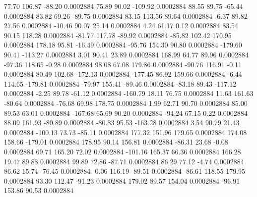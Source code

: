        77.70      106.87      -88.20     0.0002884
       75.89       90.02     -109.92     0.0002884
       88.55       89.75      -65.44     0.0002884
       83.82       69.26      -89.75     0.0002884
       83.15      113.56       89.64     0.0002884
       -6.37       89.82       27.56     0.0002884
      -10.46       90.07       25.14     0.0002884
        4.24       61.17        0.12     0.0002884
       83.54       90.15      118.28     0.0002884
      -81.77      117.78      -89.92     0.0002884
      -85.82      102.42      170.95     0.0002884
      178.18       95.81      -16.49     0.0002884
      -95.76      154.30       90.80     0.0002884
     -179.60       90.41     -113.27     0.0002884
        3.01       90.41       23.89     0.0002884
      168.99       64.77       89.96     0.0002884
      -97.36      118.65       -0.28     0.0002884
       98.08       67.08      179.86     0.0002884
      -90.76      116.91       -0.11     0.0002884
       80.49      102.68     -172.13     0.0002884
     -177.45       86.92      159.66     0.0002884
       -6.44      114.65     -179.81     0.0002884
      -79.97      155.41      -89.46     0.0002884
      -83.18       89.43     -117.12     0.0002884
       -2.25       89.78      -61.12     0.0002884
     -160.79       18.11       76.75     0.0002884
       11.63      161.63      -80.64     0.0002884
      -76.68       69.98      178.75     0.0002884
        1.99       62.71       90.70     0.0002884
       85.00       89.53       63.01     0.0002884
     -167.68       65.69       90.20     0.0002884
      -94.24       67.15        0.22     0.0002884
       88.09      161.93      -80.89     0.0002884
      -80.83       95.53     -163.28     0.0002884
        3.54       90.79       21.43     0.0002884
     -100.13       73.73      -85.11     0.0002884
      177.32      151.96      179.65     0.0002884
      174.08      158.66     -179.01     0.0002884
      178.95       90.14      156.81     0.0002884
      -86.31       23.68       -0.08     0.0002884
       69.71      165.20       72.02     0.0002884
     -101.16      165.37       66.36     0.0002884
      166.28       19.47       89.88     0.0002884
       99.89       72.86      -87.71     0.0002884
       86.29       77.12       -4.74     0.0002884
       86.62       15.74      -76.45     0.0002884
       -0.06      116.19      -89.51     0.0002884
      -86.61      118.55      179.95     0.0002884
       93.30      112.47      -91.23     0.0002884
      179.02       89.57      154.04     0.0002884
      -96.91      153.86       90.53     0.0002884
